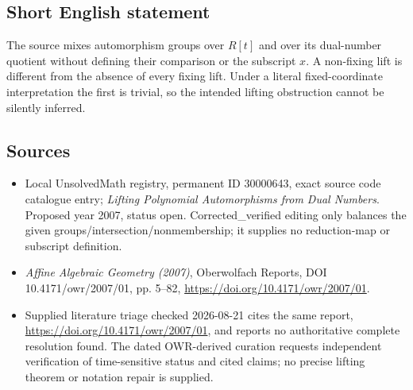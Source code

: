 \documentclass[11pt]{article}
\begin{document}
\subsection{Short English statement}
The source mixes automorphism groups over $R[t]$ and over its dual-number quotient without defining their comparison or the subscript $x$. A non-fixing lift is different from the absence of every fixing lift. Under a literal fixed-coordinate interpretation the first is trivial, so the intended lifting obstruction cannot be silently inferred.
\subsection{Sources}
\begin{itemize}
\item Local UnsolvedMath registry, permanent ID 30000643, exact source code catalogue entry; \emph{Lifting Polynomial Automorphisms from Dual Numbers}. Proposed year 2007, status open. Corrected\_verified editing only balances the given groups/intersection/nonmembership; it supplies no reduction-map or subscript definition.
\item \emph{Affine Algebraic Geometry (2007)}, Oberwolfach Reports, DOI 10.4171/owr/2007/01, pp. 5--82, \url{https://doi.org/10.4171/owr/2007/01}.
\item Supplied literature triage checked 2026-08-21 cites the same report, \url{https://doi.org/10.4171/owr/2007/01}, and reports no authoritative complete resolution found. The dated OWR-derived curation requests independent verification of time-sensitive status and cited claims; no precise lifting theorem or notation repair is supplied.
\end{itemize}
\end{document}

